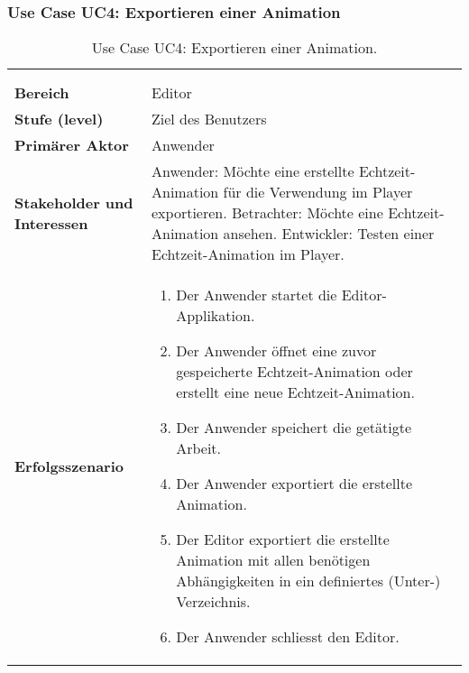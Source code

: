 
\subsubsection{Use Case UC4: Exportieren einer Animation}
\label{ssubsec:requirements:use-cases:uc4}

\begin{longtabu}{p{0.5\textwidth}p{0.5\textwidth}}
    \centering\\
    \caption{Use Case UC4: Exportieren einer
        Animation.}\label{table:uc4-export-demo}\\
    \toprule
        \textbf{Bereich} &
        Editor \\
    \cmidrule(r){1-1}\cmidrule(lr){2-2}
        \textbf{Stufe (level)} &
        Ziel des Benutzers \\
    \cmidrule(r){1-1}\cmidrule(lr){2-2}
        \textbf{Primärer Aktor} &
        Anwender \\
    \cmidrule(r){1-1}\cmidrule(lr){2-2}
        \textbf{Stakeholder und Interessen} &
        Anwender: Möchte eine erstellte Echtzeit-Animation für die
        Verwendung im Player exportieren. \newline
        Betrachter: Möchte eine Echtzeit-Animation ansehen. \newline
        Entwickler: Testen einer Echtzeit-Animation im Player. \\
    \cmidrule(r){1-1}\cmidrule(lr){2-2}
        \textbf{Erfolgsszenario} &
        \begin{enumerate}
            \item{Der Anwender startet die Editor-Applikation.}
                \item{Der Anwender öffnet eine zuvor gespeicherte
                        Echtzeit-Animation oder erstellt eine neue
                        Echtzeit-Animation.}
            \item{Der Anwender speichert die getätigte Arbeit.}
            \item{Der Anwender exportiert die erstellte Animation.}
            \item{Der Editor exportiert die erstellte Animation mit allen
                    benötigen Abhängigkeiten in ein definiertes (Unter-)
                    Verzeichnis.}
            \item{Der Anwender schliesst den Editor.}

\end{enumerate}
\end{longtabu}
